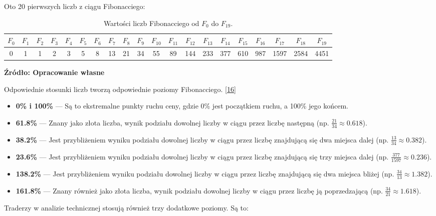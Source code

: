 \documentclass[12pt,a4paper,twoside, inzynierska]{pwr_wmat_praca_dyplomowa}
\theoremstyle{plain}
\numberwithin{theorem}{chapter}
\theoremstyle{definition}
\numberwithin{theorem}{chapter}
\begin{document}
	\noindent Oto 20 pierwszych liczb z ciągu Fibonacciego: 
	\vspace{12pt}
	\setlength{\tabcolsep}{3pt}
	\begin{table}[h!]
		\centering
		\begin{tabular}{|c|c|c|c|c|c|c|c|c|c|c|c|c|c|c|c|c|c|c|c|}
			\hline
			$F_0$ & $F_1$ & $F_2$ & $F_3$ & $F_4$ & $F_5$ & $F_6$ & $F_7$ & $F_8$ & $F_9$ & $F_{10}$ & $F_{11}$ & $F_{12}$ & $F_{13}$ & $F_{14}$ & $F_{15}$ & $F_{16}$ & $F_{17}$ & $F_{18}$ & $F_{19}$\\
			\hline
			0 & 1 & 1 & 2 & 3 & 5 & 8 & 13 & 21 & 34 & 55 & 89 & 144 & 233 & 377 & 610 & 987 & 1597 & 2584 & 4451 \\
			\hline
		\end{tabular}
		\caption{Wartości liczb Fibonacciego od $F_0$ do $F_{19}$.}
		\textbf{Źródło: Opracowanie własne}
	\end{table}
	\vspace{12pt}
	\noindent Odpowiednie stosunki liczb tworzą odpowiednie poziomy Fibonacciego. \hyperref[info16]{[16]}\newline
	\begin{itemize}
		\item \textbf{0\% i 100\%} --- Są to ekstremalne punkty ruchu ceny, gdzie 0\% jest początkiem ruchu, a 100\% jego końcem.
		\item \textbf{61.8\%} --- Znany jako złota liczba, wynik podziału dowolnej liczby w ciągu przez liczbę następną (np. $\frac{21}{34} \approx 0.618$).
		\item \textbf{38.2\%} --- Jest przybliżeniem wyniku podziału dowolnej liczby w ciągu przez liczbę znajdującą się dwa miejsca dalej (np. $\frac{13}{34} \approx 0.382$).
		\item \textbf{23.6\%} --- Jest przybliżeniem wyniku podziału dowolnej liczby w ciągu przez liczbę znajdującą się trzy miejsca dalej (np. $\frac{377}{1597} \approx 0.236$).
		\item \textbf{138.2\%} --- Jest przybliżeniem wyniku podziału dowolnej liczby w ciągu przez liczbę znajdującą się dwa miejsca bliżej (np. $\frac{34}{13} \approx 1.382$).
		\item \textbf{161.8\%} --- Znany również jako złota liczba, wynik podziału dowolnej liczby w ciągu przez liczbę ją poprzedzającą (np. $\frac{34}{21} \approx 1.618$).\newline
	\end{itemize}

	
	\noindent Traderzy w analizie technicznej stosują również trzy dodatkowe poziomy. Są to: \newline
	
\end{document}
